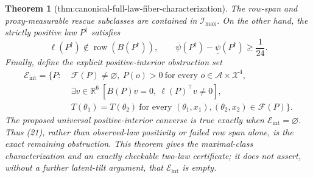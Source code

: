 \documentclass{article}
\newtheorem{theorem}{Theorem}
\begin{document}
\begin{theorem}[thm:canonical-full-law-fiber-characterization]
The row-span and proxy-measurable rescue subclasses are contained in
\(\mathcal I_{\max}\).  On the other hand, the strictly positive law
\(P^{\dagger}\) satisfies
\[
 \ell(P^{\dagger})\notin\operatorname{row}(B(P^{\dagger})),
 \qquad
 \overline\psi(P^{\dagger})-\underline\psi(P^{\dagger})\ge\frac1{24}.
 \tag{20}
\]
Finally, define the explicit positive-interior obstruction set
\[
\begin{aligned}
 \mathcal E_{\mathrm{int}}=\{P:\;&\mathcal F(P)\ne\varnothing,
 \ P(o)>0\ \text{for every }o\in\mathcal A\times\mathcal X^4,\\
 &\exists v\in\mathbb R^6\ [B(P)v=0,\ \ell(P)^\top v\ne0],\\
 &T(\theta_1)=T(\theta_2)\ \text{for every }
   (\theta_1,x_1),(\theta_2,x_2)\in\mathcal F(P)\}.
\end{aligned}
 \tag{21}
\]
The proposed universal positive-interior converse is true exactly when
\(\mathcal E_{\mathrm{int}}=\varnothing\).  Thus (21), rather than observed-law
positivity or failed row span alone, is the exact remaining obstruction.  This
theorem gives the maximal-class characterization and an exactly checkable
two-law certificate; it does not assert, without a further latent-tilt argument,
that \(\mathcal E_{\mathrm{int}}\) is empty.
\end{theorem}
\end{document}
